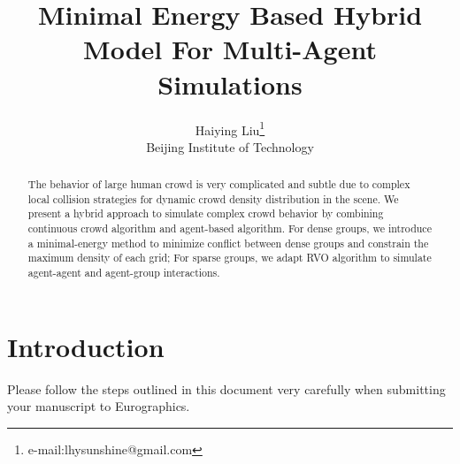 

\title{Minimal Energy Based Hybrid Model For Multi-Agent Simulations}

\author{Haiying Liu\thanks{e-mail:lhysunshine@gmail.com}\\Beijing Institute of Technology}





\maketitle

\begin{abstract}
   The behavior of large human crowd is very complicated and subtle due to complex local collision strategies for dynamic crowd density distribution in the scene. We present a hybrid approach to simulate complex crowd behavior by combining continuous crowd algorithm and agent-based algorithm. For dense groups, we introduce a minimal-energy method to minimize conflict between dense groups and constrain the maximum density of each grid; For sparse groups, we adapt RVO algorithm to simulate agent-agent and agent-group interactions.

\begin{classification} %
\end{classification}

\end{abstract}





\section{Introduction}

Please follow the steps outlined in this document very carefully when
submitting your manuscript to Eurographics.

